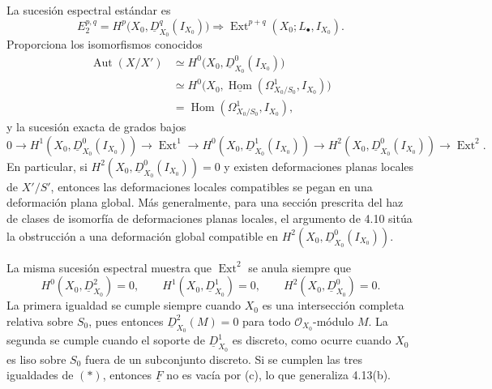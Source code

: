 La sucesión espectral estándar es
\[
E_2^{p,q}
=H^p\bigl(X_0,\underline D^q_{X_0}(I_{X_0})\bigr)
\Longrightarrow
\operatorname{Ext}^{p+q}(X_0;L_\bullet,I_{X_0}).
\]
Proporciona los isomorfismos conocidos
\begin{align*}
\operatorname{Aut}(X/X')
&\simeq H^0\bigl(X_0,\underline D^0_{X_0}(I_{X_0})\bigr)\\
&\simeq H^0\bigl(X_0,
  \underline{\operatorname{Hom}}
  (\Omega^1_{X_0/S_0},I_{X_0})\bigr)\\
&=\operatorname{Hom}(\Omega^1_{X_0/S_0},I_{X_0}),
\end{align*}
y la sucesión exacta de grados bajos
\[
0\longrightarrow H^1(X_0,\underline D^0_{X_0}(I_{X_0}))
\longrightarrow\operatorname{Ext}^1
\longrightarrow H^0(X_0,\underline D^1_{X_0}(I_{X_0}))
\longrightarrow H^2(X_0,\underline D^0_{X_0}(I_{X_0}))
\longrightarrow\operatorname{Ext}^2.
\]
En particular, si
$H^2(X_0,\underline D^0_{X_0}(I_{X_0}))=0$ y existen deformaciones
planas locales de $X'/S'$, entonces las deformaciones locales
compatibles se pegan en una deformación plana global. Más
generalmente, para una sección prescrita del haz de clases de
isomorfía de deformaciones planas locales, el argumento de 4.10 sitúa
la obstrucción a una deformación global compatible en
$H^2(X_0,\underline D^0_{X_0}(I_{X_0}))$.


La misma sucesión espectral muestra que $\operatorname{Ext}^2$ se
anula siempre que
\begin{equation}\tag{*}
H^0(X_0,\underline D^2_{X_0})=0,
\qquad
H^1(X_0,\underline D^1_{X_0})=0,
\qquad
H^2(X_0,\underline D^0_{X_0})=0.
\end{equation}
La primera igualdad se cumple siempre cuando $X_0$ es una
intersección completa relativa sobre $S_0$, pues entonces
$\underline D^2_{X_0}(M)=0$ para todo $\mathcal O_{X_0}$-módulo $M$.
La segunda se cumple cuando el soporte de $\underline D^1_{X_0}$ es
discreto, como ocurre cuando $X_0$ es liso sobre $S_0$ fuera de un
subconjunto discreto. Si se cumplen las tres igualdades de $(*)$,
entonces $\underline F$ no es vacía por (c), lo que generaliza
4.13(b).

